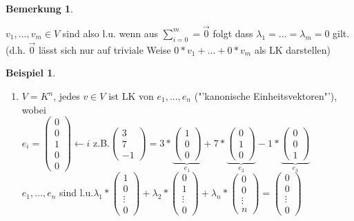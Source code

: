 \documentclass[a4paper,11pt]{article}
\newtheorem{bsp}[definition]{Beispiel}
\newtheorem{bem}[definition]{Bemerkung}
\begin{document}
\begin{bem}
\end{bem}
$v_1,...,v_m\in V$ sind also l.u. wenn aus $\sum^m_{i=0}=\overset{\rightarrow}{0}$ folgt dass $\lambda_1=...=\lambda_m=0$ gilt. (d.h. $\overset{\rightarrow}{0}$ lässt sich nur auf triviale Weise $0*v_1+...+0*v_m$ als LK darstellen)
\newpage
\begin{bsp}
\end{bsp}
\begin{enumerate}[label=\alph*)]
\item $V=K^n$, jedes $v\in V$ ist LK von $e_1,...,e_n$ ("'kanonische Einheitsvektoren"'), wobei \\
$e_i=\begin{pmatrix}0\\0\\1\\0\\0\end{pmatrix}\leftarrow i$ \hspace{5mm}z.B.$\begin{pmatrix}3\\7\\-1\end{pmatrix}=3*\underbrace{\begin{pmatrix}1\\0\\0\end{pmatrix}}_{e_1}+7*\underbrace{\begin{pmatrix}0\\1\\0\end{pmatrix}}_{e_2}-1*\underbrace{\begin{pmatrix}0\\0\\1\end{pmatrix}}_{e_3}$ \\
$e_1,...,e_n$ sind l.u.\hspace{5mm}$\lambda_1*\begin{pmatrix}1\\0\\\vdots\\0\end{pmatrix}+\lambda_2*\begin{pmatrix}0\\1\\\vdots\\0\end{pmatrix}+\lambda_n*\begin{pmatrix}0\\0\\\vdots\\n\end{pmatrix}=\begin{pmatrix}0\\0\\\vdots\\0\end{pmatrix}$ \\

\end{enumerate}
\end{document}
